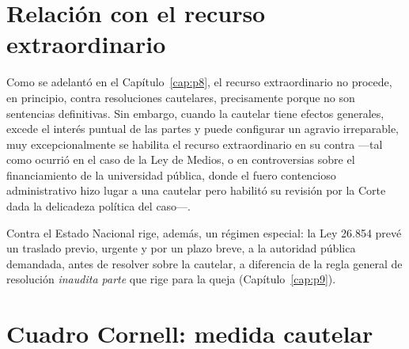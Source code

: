\documentclass[12pt,oneside]{book}
\begin{document}
\section{Relación con el recurso extraordinario}

Como se adelantó en el Capítulo~\ref{cap:p8}, el recurso extraordinario no procede,
en principio, contra resoluciones cautelares, precisamente porque no son
sentencias definitivas. Sin embargo, cuando la cautelar tiene efectos generales,
excede el interés puntual de las partes y puede configurar un agravio irreparable,
muy excepcionalmente se habilita el recurso extraordinario en su contra —tal como
ocurrió en el caso de la Ley de Medios, o en controversias sobre el financiamiento
de la universidad pública, donde el fuero contencioso administrativo hizo lugar a
una cautelar pero habilitó su revisión por la Corte dada la delicadeza política del
caso—.

Contra el Estado Nacional rige, además, un régimen especial: la Ley 26.854 prevé
un traslado previo, urgente y por un plazo breve, a la autoridad pública
demandada, antes de resolver sobre la cautelar, a diferencia de la regla general
de resolución \textit{inaudita parte} que rige para la queja (Capítulo~\ref{cap:p9}).

\section{Cuadro Cornell: medida cautelar}
\end{document}
